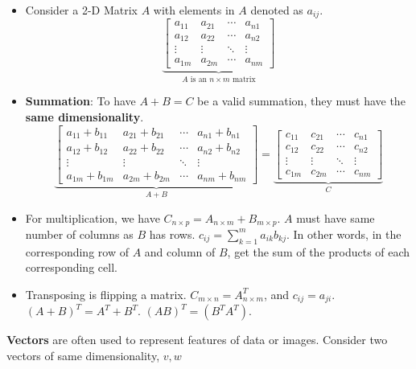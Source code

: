 \documentclass{article}
\begin{document}
\begin{itemize}
    \item Consider a 2-D Matrix $A$ with elements in $A$ denoted as $a_{ij}$.
    $$\underbrace{\begin{bmatrix}
    a_{11} & a_{21} & \cdots & a_{n1} \\ 
    a_{12} & a_{22} & \cdots & a_{n2} \\ 
    \vdots & \vdots & \ddots & \vdots \\ 
    a_{1m} & a_{2m} & \cdots & a_{nm}
    \end{bmatrix}}_{A\text{ is an }n\times m \text{ matrix}}$$
    
    \item \textbf{Summation}: To have $A+B = C$ be a valid summation, they must have the \textbf{same dimensionality}.
    $$\underbrace{\begin{bmatrix}
    a_{11}+b_{11} & a_{21}+b_{21} & \cdots & a_{n1}+b_{n1} \\ 
    a_{12}+b_{12} & a_{22}+b_{22} & \cdots & a_{n2}+b_{n2} \\ 
    \vdots & \vdots & \ddots & \vdots \\ 
    a_{1m}+b_{1m} & a_{2m}+b_{2m} & \cdots & a_{nm}+b_{nm}
    \end{bmatrix}}_{A+B} = \underbrace{\begin{bmatrix}
    c_{11} & c_{21} & \cdots & c_{n1} \\ 
    c_{12} & c_{22} & \cdots & c_{n2} \\ 
    \vdots & \vdots & \ddots & \vdots \\ 
    c_{1m} & c_{2m} & \cdots & c_{nm}
    \end{bmatrix}}_C$$
    
    

    \item For multiplication, we have $C_{n\times p} = A_{n\times m} + B_{m\times p}$. $A$ must have same number of columns as $B$ has rows. $c_{ij} = \sum^m_{k=1}a_{ik}b_{kj}$. In other words, in the corresponding row of $A$ and column of $B$, get the sum of the products of each corresponding cell.
    \item Transposing is flipping a matrix. $C_{m\times n} = A^T_{n\times m}$, and $c_{ij} = a_{ji}$. $(A+B)^T = A^T + B^T$. $(AB)^T = (B^TA^T)$.
    
\end{itemize}
\textbf{Vectors} are often used to represent features of data or images. Consider two vectors of same dimensionality, $v, w$
\end{document}
